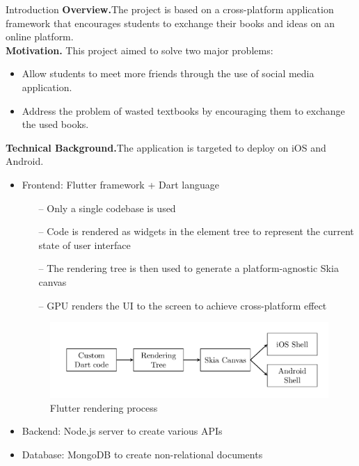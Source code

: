 \begin{block}{Introduction}
    \textbf{Overview.\space}The project is based on a cross-platform application framework that encourages students to exchange their books and ideas on an online platform.\\
    \textbf{Motivation.\space} This project aimed to solve two major problems:
    \begin{itemize}
        \item Allow students to meet more friends through the use of social media application. \cite{covid19:2022jd,Parlak:2012qr}
        \item Address the problem of wasted textbooks by encouraging them to exchange the used books.
    \end{itemize}
    \textbf{Technical Background.\space}The application is targeted to deploy on iOS and Android.
    \begin{itemize}
        \item Frontend: Flutter framework + Dart language \cite{Flutter:Documentation}
            \begin{itemize}
                \item[--] Only a single codebase is used
                \item[--] Code is rendered as widgets in the element tree to represent the current state of user interface
                \item[--] The rendering tree is then used to generate a platform-agnostic Skia canvas
                \item[--] GPU renders the UI to the screen to achieve cross-platform effect
            \end{itemize}
            \begin{figure}
                \includegraphics[width=\linewidth]{rendering.png}
                \caption{Flutter rendering process}
            \end{figure}
        \vspace{-2.3cm}
        \item Backend: Node.js server to create various APIs
        \item Database: MongoDB to create non-relational documents \cite{MongoDB:Documentation}

\end{itemize}
\end{block}
